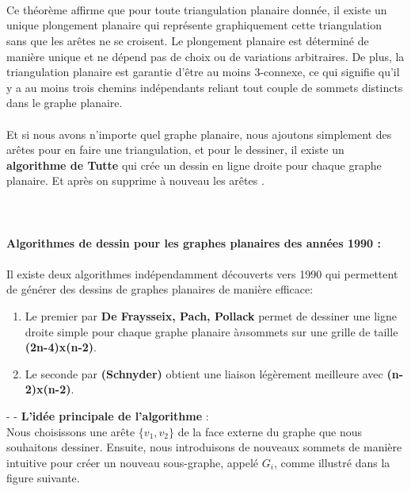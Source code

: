 \documentclass[hidelinks,letterpaper,12pt]{article}
\begin{document}
\\ \\ \\
Ce théorème affirme que pour toute triangulation planaire donnée, il existe un unique plongement planaire qui représente graphiquement cette triangulation sans que les arêtes ne se croisent. Le plongement planaire est déterminé de manière unique et ne dépend pas de choix ou de variations arbitraires. De plus, la triangulation planaire est garantie d'être au moins 3-connexe, ce qui signifie qu'il y a au moins trois chemins indépendants reliant tout couple de sommets distincts dans le graphe planaire.
\\ \\
Et si nous avons n'importe quel graphe planaire, nous ajoutons simplement des arêtes pour en faire une triangulation, et pour le dessiner, il existe un \textbf{algorithme de Tutte} \citep{Tutte} qui crée un dessin en ligne droite pour chaque graphe planaire. Et après on supprime à nouveau les arêtes \citep{PhilippKindermann}.
\\	\\ \\ \\ 
\textbf{Algorithmes de dessin pour les graphes planaires des années 1990 :}
\\ \\
Il existe deux algorithmes indépendamment découverts vers 1990 qui permettent de générer des dessins de graphes planaires de manière efficace:
\begin{enumerate}
\item Le premier par \textbf{De Fraysseix, Pach, Pollack} \citep{FraysseixPachPollack} permet de dessiner une ligne droite simple pour chaque graphe planaire à$n$sommets sur une grille de taille \textbf{(2n-4)x(n-2)}.
\item Le seconde par \textbf{(Schnyder)} \citep{Schnyder} obtient une liaison légèrement meilleure avec \textbf{(n-2)x(n-2)}. 
\end{enumerate}	
{\color{white}-}
\bigbreak
{\color{white}-}
\textbf{L'idée principale de l'algorithme} : 
\\
Nous choisissons une arête \( \{v_{1},v_{2}\} \) de la face externe du graphe que nous souhaitons dessiner. Ensuite, nous introduisons de nouveaux sommets de manière intuitive pour créer un nouveau sous-graphe, appelé $G_{i}$, comme illustré dans la figure suivante.
\bigbreak 	
\end{document}
